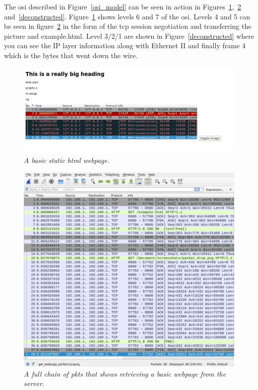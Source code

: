 \documentclass[titlepage]{article}
\begin{document}
The \gls{osi} described in Figure~\ref{osi_model} can be seen in action in Figures~\ref{basicwebpage},~\ref{getrequest} and~\ref{deconstructed}.
Figure~\ref{basicwebpage} shows levels 6 and 7 of the \gls{osi}.
Levels 4 and 5 can be seen in figure~\ref{getrequest} in the form of the \gls{tcp}
session negotiation and transferring the picture and example.html.
Level 3/2/1 are shown in Figure~\ref{deconstructed} where you can see the IP layer information
along with Ethernet II and finally frame 4 which is the bytes that went down the wire.

\begin{figure}[H]
  \centering
  \begin{framed}
  \includegraphics[width=\textwidth]{basic_webpage.png}
  \end{framed}
    \caption{\textit{%
    A basic static \gls{html} webpage.
}}\label{basicwebpage}
\end{figure}

\begin{figure}[H]
  \centering
  \includegraphics[width=\textwidth]{website_get.png}
    \caption{\textit{%
    A full chain of \glspl{pkt} that shows retrieving a basic webpage
    from the server.
}}\label{getrequest}
\end{figure}
\end{document}
